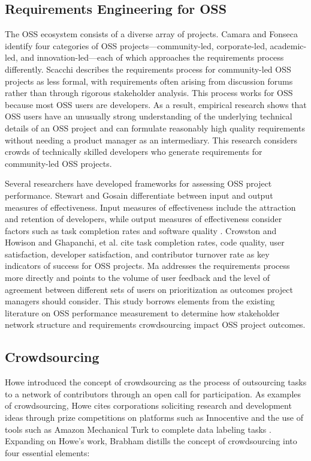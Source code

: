 \subsection{Requirements Engineering for OSS}
\label{oss_re}

The OSS ecosystem consists of a diverse array of projects. Camara and Fonseca \cite{camara} identify four categories of OSS projects---community-led, corporate-led, academic-led, and innovation-led---each of which approaches the requirements process differently. Scacchi \cite{scacchi} describes the requirements process for community-led OSS projects as less formal, with requirements often arising from discussion forums rather than through rigorous stakeholder analysis. This process works for OSS because most OSS users are developers. As a result, empirical research \cite{kuriakose, paech} shows that OSS users have an unusually strong understanding of the underlying technical details of an OSS project and can formulate reasonably high quality requirements without needing a product manager as an intermediary. This research considers crowds of technically skilled developers who generate requirements for community-led OSS projects.

Several researchers have developed frameworks for assessing OSS project performance. Stewart and Gosain \cite{stewart} differentiate between input and output measures of effectiveness. Input measures of effectiveness include the attraction and retention of developers, while output measures of effectiveness consider factors such as task completion rates and software quality \cite{stewart}. Crowston and Howison \cite{crowston} and Ghapanchi, et al. \cite{ghapanchi} cite task completion rates, code quality, user satisfaction, developer satisfaction, and contributor turnover rate as key indicators of success for OSS projects. Ma \cite{ma} addresses the requirements process more directly and points to the volume of user feedback and the level of agreement between different sets of users on prioritization as outcomes project managers should consider. This study borrows elements from the existing literature on OSS performance measurement to determine how stakeholder network structure and requirements crowdsourcing impact OSS project outcomes.

\subsection{Crowdsourcing}
\label{crowdsourcing}

Howe \cite{howe, howe2} introduced the concept of crowdsourcing as the process of outsourcing tasks to a network of contributors through an open call for participation. As examples of crowdsourcing, Howe cites corporations soliciting research and development ideas through prize competitions on platforms such as Innocentive \cite{howe} and the use of tools such as Amazon Mechanical Turk to complete data labeling tasks \cite{howe}. Expanding on Howe's work, Brabham \cite{brabham, brabham2} distills the concept of crowdsourcing into four essential elements: 

